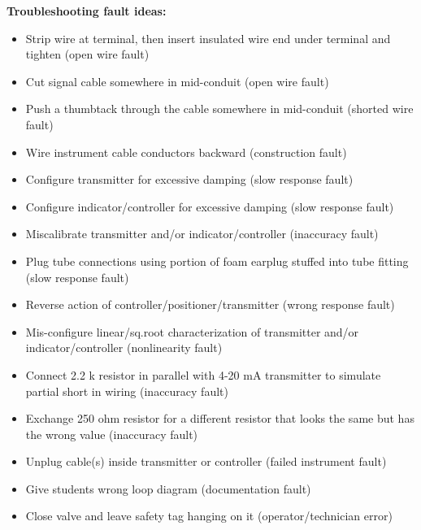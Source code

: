 \documentclass[12pt,a4paper]{article}
\begin{document}
\noindent
{\bf Troubleshooting fault ideas:}

\begin{itemize}
\goodbreak
\item{} Strip wire at terminal, then insert insulated wire end under terminal and tighten (open wire fault)
\item{} Cut signal cable somewhere in mid-conduit (open wire fault)
\item{} Push a thumbtack through the cable somewhere in mid-conduit (shorted wire fault)
\item{} Wire instrument cable conductors backward (construction fault)
\item{} Configure transmitter for excessive damping (slow response fault)
\item{} Configure indicator/controller for excessive damping (slow response fault)
\item{} Miscalibrate transmitter and/or indicator/controller (inaccuracy fault)
\item{} Plug tube connections using portion of foam earplug stuffed into tube fitting (slow response fault)
\item{} Reverse action of controller/positioner/transmitter (wrong response fault)
\item{} Mis-configure linear/sq.root characterization of transmitter and/or indicator/controller (nonlinearity fault)
\item{} Connect 2.2 k resistor in parallel with 4-20 mA transmitter to simulate partial short in wiring (inaccuracy fault)
\item{} Exchange 250 ohm resistor for a different resistor that looks the same but has the wrong value (inaccuracy fault) 
\item{} Unplug cable(s) inside transmitter or controller (failed instrument fault)
\item{} Give students wrong loop diagram (documentation fault)
\item{} Close valve and leave safety tag hanging on it (operator/technician error)
\end{itemize}




















\vfil \eject
\end{document}
